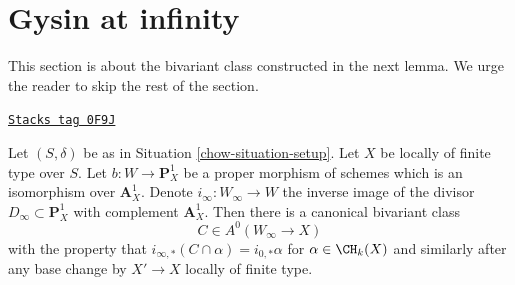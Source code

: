 \section{Gysin at infinity}
\label{chow-section-gysin-at-infty}
This section is about the bivariant class constructed in the next
lemma. We urge the reader to skip the rest of the section.

\begin{lemma}
\label{chow-lemma-gysin-at-infty}
\href{https://stacks.math.columbia.edu/tag/0F9J}{\texttt{Stacks tag 0F9J}}

Let $(S, \delta)$ be as in Situation \ref{chow-situation-setup}.
Let $X$ be locally of finite type over $S$. Let
$b : W \to \mathbf{P}^1_X$ be a proper morphism of schemes
which is an isomorphism over $\mathbf{A}^1_X$.
Denote $i_\infty : W_\infty \to W$ the inverse image of the divisor
$D_\infty \subset \mathbf{P}^1_X$ with complement $\mathbf{A}^1_X$.
Then there is a canonical bivariant class
$$
C \in A^0(W_\infty \to X)
$$
with the property that
$i_{\infty, *}(C \cap \alpha) = i_{0, *}\alpha$
for $\alpha \in \CH_k(X)$ and similarly after any base change by
$X' \to X$ locally of finite type.
\end{lemma}

